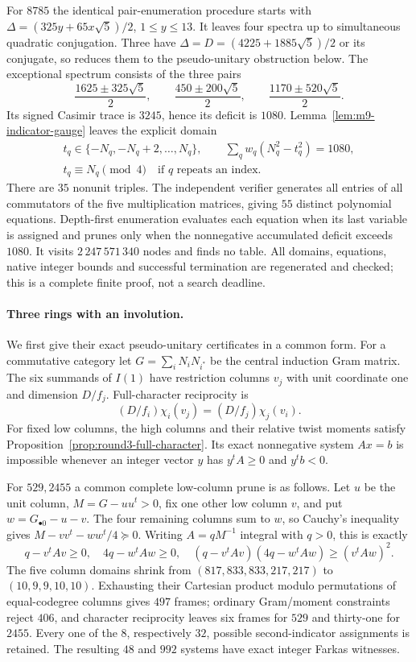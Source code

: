 For $8785$ the identical pair-enumeration procedure starts with
$\Delta=(325y+65x\sqrt5)/2$, $1\le y\le13$.
It leaves four spectra up to simultaneous quadratic conjugation.
Three have $\Delta=D=(4225+1885\sqrt5)/2$ or its conjugate, so
\cite[Proposition~8.23]{ENO} reduces them to the pseudo-unitary
obstruction below. The exceptional spectrum consists of the three pairs
\[
 \frac{1625\pm325\sqrt5}{2},\qquad
 \frac{450\pm200\sqrt5}{2},\qquad
 \frac{1170\pm520\sqrt5}{2}.
\]
Its signed Casimir trace is $3245$, hence its deficit is $1080$.
Lemma~\ref{lem:m9-indicator-gauge} leaves the explicit domain
\[
\begin{gathered}
 t_q\in\{-N_q,-N_q+2,\ldots,N_q\},\qquad
 \sum_qw_q(N_q^2-t_q^2)=1080,\\
 t_q\equiv N_q\pmod4\quad\text{if }q\text{ repeats an index}.
\end{gathered}
\]
There are $35$ nonunit triples. The independent verifier generates all
entries of all commutators of the five multiplication matrices, giving
$55$ distinct polynomial equations. Depth-first enumeration evaluates
each equation when its last variable is assigned and prunes only when
the nonnegative accumulated deficit exceeds $1080$. It visits
$2\,247\,571\,340$ nodes and finds no table. All domains, equations,
native integer bounds and successful termination are regenerated and
checked; this is a complete finite proof, not a search deadline.

\paragraph{Three rings with an involution.}
We first give their exact pseudo-unitary certificates in a common form.
For a commutative category let $G=\sum_iN_iN_{i^*}$ be the central
induction Gram matrix. The six summands of $I(1)$ have restriction
columns $v_j$ with unit coordinate one and dimension $D/f_j$.
Full-character reciprocity is
\[
 (D/f_i)\chi_i(v_j)=(D/f_j)\chi_j(v_i).
\]
For fixed low columns, the high columns and their relative twist moments
satisfy Proposition~\ref{prop:round3-full-character}. Its exact
nonnegative system $Ax=b$ is impossible whenever an integer vector
$y$ has $y^tA\ge0$ and $y^tb<0$.

For $529,2455$ a common complete low-column prune is as follows.
Let $u$ be the unit column, $M=G-uu^t>0$, fix one other low column $v$,
and put $w=G_{\bullet0}-u-v$. The four remaining columns sum to $w$,
so Cauchy's inequality gives
$M-vv^t-ww^t/4\succeq0$.
Writing $A=qM^{-1}$ integral with $q>0$, this is exactly
\[
 q-v^tAv\ge0,\quad4q-w^tAw\ge0,\quad
 (q-v^tAv)(4q-w^tAw)\ge(v^tAw)^2.
\]
The five column domains shrink from $(817,833,833,217,217)$ to
$(10,9,9,10,10)$. Exhausting their Cartesian product modulo
permutations of equal-codegree columns gives $497$ frames; ordinary
Gram/moment constraints reject $406$, and character reciprocity leaves
six frames for $529$ and thirty-one for $2455$.
Every one of the $8$, respectively $32$, possible second-indicator
assignments is retained. The resulting $48$ and $992$ systems have
exact integer Farkas witnesses.

